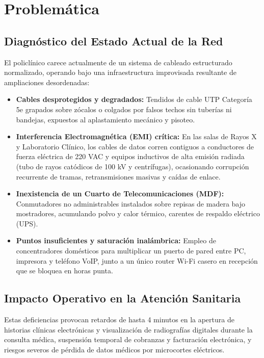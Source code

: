 \documentclass[11pt,a4paper]{article}
\begin{document}
\section{Problemática}

\subsection{Diagnóstico del Estado Actual de la Red}
El policlínico carece actualmente de un sistema de cableado estructurado normalizado, operando bajo una infraestructura improvisada resultante de ampliaciones desordenadas:
\begin{itemize}[noitemsep]
    \item \textbf{Cables desprotegidos y degradados:} Tendidos de cable UTP Categoría 5e grapados sobre zócalos o colgados por falsos techos sin tuberías ni bandejas, expuestos al aplastamiento mecánico y pisoteo.
    \item \textbf{Interferencia Electromagnética (EMI) crítica:} En las salas de Rayos X y Laboratorio Clínico, los cables de datos corren contiguos a conductores de fuerza eléctrica de 220 VAC y equipos inductivos de alta emisión radiada (tubo de rayos catódicos de 100 kV y centrífugas), ocasionando corrupción recurrente de tramas, retransmisiones masivas y caídas de enlace.
    \item \textbf{Inexistencia de un Cuarto de Telecomunicaciones (MDF):} Conmutadores no administrables instalados sobre repisas de madera bajo mostradores, acumulando polvo y calor térmico, carentes de respaldo eléctrico (UPS).
    \item \textbf{Puntos insuficientes y saturación inalámbrica:} Empleo de concentradores domésticos para multiplicar un puerto de pared entre PC, impresora y teléfono VoIP, junto a un único router Wi-Fi casero en recepción que se bloquea en horas punta.
\end{itemize}

\subsection{Impacto Operativo en la Atención Sanitaria}
Estas deficiencias provocan retardos de hasta 4 minutos en la apertura de historias clínicas electrónicas y visualización de radiografías digitales durante la consulta médica, suspensión temporal de cobranzas y facturación electrónica, y riesgos severos de pérdida de datos médicos por microcortes eléctricos.
\end{document}

